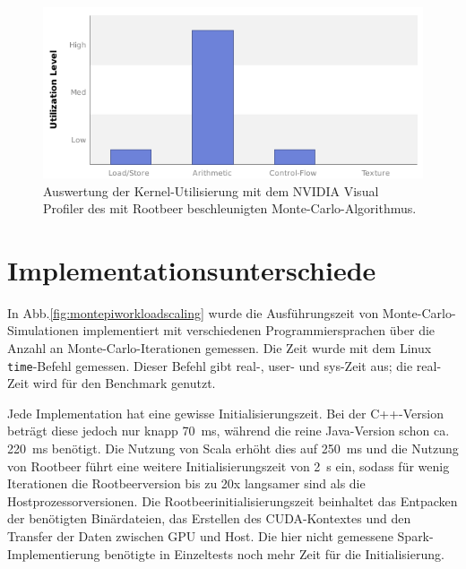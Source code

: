 \begin{figure}
	\centering
	\begin{minipage}{0.7\linewidth}
		\includegraphics[width=\linewidth]{../presentation/kernel-utilization}
	\end{minipage}
	\caption{Auswertung der Kernel-Utilisierung mit dem NVIDIA Visual Profiler des mit Rootbeer beschleunigten Monte-Carlo-Algorithmus.}
	\label{fig:utilization}
\end{figure}


\section{Implementationsunterschiede}

In Abb.\ref{fig:montepiworkloadscaling} wurde die Ausführungszeit von Monte-Carlo-Simulationen implementiert mit verschiedenen Programmiersprachen über die Anzahl an Monte-Carlo-Iterationen gemessen.
Die Zeit wurde mit dem Linux \lstinline!time!-Befehl gemessen. Dieser Befehl gibt real-, user- und sys-Zeit aus; die real-Zeit wird für den Benchmark genutzt.

Jede Implementation hat eine gewisse Initialisierungszeit. Bei der C++-Version beträgt diese jedoch nur knapp \SI{70}{\milli\second}, während die reine Java-Version schon ca. \SI{220}{\milli\second} benötigt.
Die Nutzung von Scala erhöht dies auf \SI{250}{\milli\second} und die Nutzung von Rootbeer führt eine weitere Initialisierungszeit von \SI{2}{\second} ein, sodass für wenig Iterationen die Rootbeerversion bis zu 20x langsamer sind als die Hostprozessorversionen.
Die Rootbeerinitialisierungszeit beinhaltet das Entpacken der benötigten Binärdateien, das Erstellen des CUDA-Kontextes und den Transfer der Daten zwischen GPU und Host.
Die hier nicht gemessene Spark-Implementierung benötigte in Einzeltests noch mehr Zeit für die Initialisierung.

